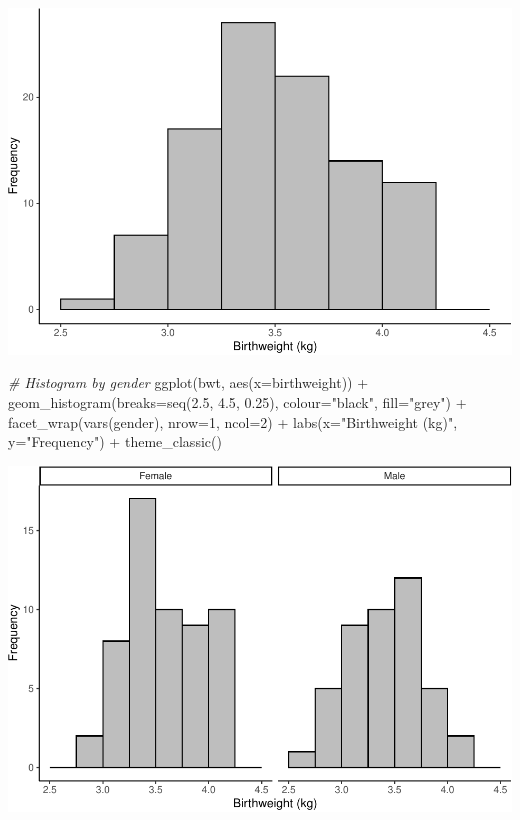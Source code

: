 \documentclass[
]{memoir}
\newenvironment{Shaded}{\begin{snugshade}}{\end{snugshade}}
\newcommand{\AttributeTok}[1]{\textcolor[rgb]{0.77,0.63,0.00}{#1}}
\newcommand{\CommentTok}[1]{\textcolor[rgb]{0.56,0.35,0.01}{\textit{#1}}}
\newcommand{\DecValTok}[1]{\textcolor[rgb]{0.00,0.00,0.81}{#1}}
\newcommand{\FloatTok}[1]{\textcolor[rgb]{0.00,0.00,0.81}{#1}}
\newcommand{\FunctionTok}[1]{\textcolor[rgb]{0.00,0.00,0.00}{#1}}
\newcommand{\NormalTok}[1]{#1}
\newcommand{\SpecialCharTok}[1]{\textcolor[rgb]{0.00,0.00,0.00}{#1}}
\newcommand{\StringTok}[1]{\textcolor[rgb]{0.31,0.60,0.02}{#1}}
\begin{document}
\includegraphics{05.1-Means-R_files/figure-latex/unnamed-chunk-4-1.pdf}

\begin{Shaded}
\begin{Highlighting}[]

\CommentTok{\# Histogram by gender}
\FunctionTok{ggplot}\NormalTok{(bwt, }\FunctionTok{aes}\NormalTok{(}\AttributeTok{x=}\NormalTok{birthweight)) }\SpecialCharTok{+} 
  \FunctionTok{geom\_histogram}\NormalTok{(}\AttributeTok{breaks=}\FunctionTok{seq}\NormalTok{(}\FloatTok{2.5}\NormalTok{, }\FloatTok{4.5}\NormalTok{, }\FloatTok{0.25}\NormalTok{), }\AttributeTok{colour=}\StringTok{"black"}\NormalTok{, }\AttributeTok{fill=}\StringTok{"grey"}\NormalTok{) }\SpecialCharTok{+} 
  \FunctionTok{facet\_wrap}\NormalTok{(}\FunctionTok{vars}\NormalTok{(gender), }\AttributeTok{nrow=}\DecValTok{1}\NormalTok{, }\AttributeTok{ncol=}\DecValTok{2}\NormalTok{) }\SpecialCharTok{+}
  \FunctionTok{labs}\NormalTok{(}\AttributeTok{x=}\StringTok{"Birthweight (kg)"}\NormalTok{, }\AttributeTok{y=}\StringTok{"Frequency"}\NormalTok{) }\SpecialCharTok{+}
  \FunctionTok{theme\_classic}\NormalTok{()}
\end{Highlighting}
\end{Shaded}

\includegraphics{05.1-Means-R_files/figure-latex/unnamed-chunk-4-2.pdf}
\end{document}
